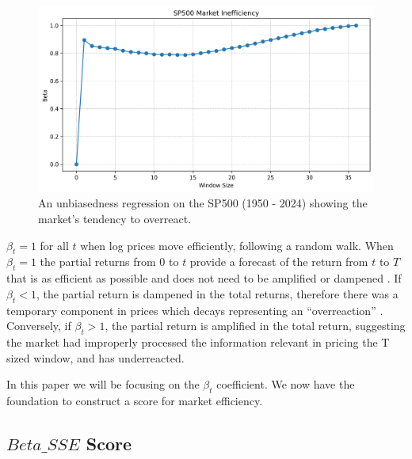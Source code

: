 \begin{figure}[h!]
    \centering
    \includegraphics[width=1\textwidth]{../figs/SP500 Market Inefficiency.png}
    \caption{An unbiasedness regression on the SP500 (1950 - 2024) showing the market's tendency to overreact.}
    \label{fig:sp_500_unbiasedness}
\end{figure}

$\beta_t = 1$ for all $t$ when log prices move efficiently, following a random walk. When 
$\beta_t = 1$ the partial returns from $0$ to $t$ provide a forecast of the return from $t$ to $T$ that is as efficient as possible 
and does not need to be amplified or dampened \citep{mincer_zarnowitz_1969}. 
 If $\beta_t < 1$, the partial return is dampened in the total returns, therefore there was a temporary component in prices which decays representing an “overreaction” \citep{barclay_hendershott_2003}.
Conversely, if $\beta_t > 1$, the partial return is amplified in the total return, suggesting the market had improperly processed the information relevant in pricing the T sized window, and has underreacted.

In this paper we will be focusing on the $\beta_t$ coefficient. 
We now have the foundation to construct a score for market efficiency.

\subsection{$Beta\_SSE$ Score}

